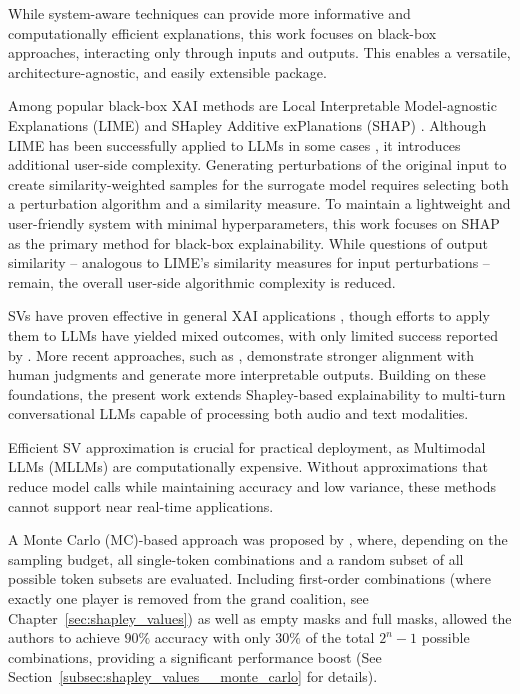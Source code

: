 \newpage
While system-aware techniques can provide more informative and computationally efficient explanations, this work focuses on black-box approaches, interacting only through inputs and outputs. This enables a versatile, architecture-agnostic, and easily extensible package.

Among popular black-box XAI methods are Local Interpretable Model-agnostic Explanations (LIME) and SHapley Additive exPlanations (SHAP) \parencite{explainableaihistory}. Although LIME has been successfully applied to LLMs in some cases \parencite{dehghani2025explaininglargelanguagemodels}, it introduces additional user-side complexity. Generating perturbations of the original input to create similarity-weighted samples for the surrogate model requires selecting both a perturbation algorithm and a similarity measure. To maintain a lightweight and user-friendly system with minimal hyperparameters, this work focuses on SHAP as the primary method for black-box explainability. While questions of output similarity -- analogous to LIME’s similarity measures for input perturbations -- remain, the overall user-side algorithmic complexity is reduced.

SVs have proven effective in general XAI applications \parencite{lundberg2017unifiedapproachinterpretingmodel}, though efforts to apply them to LLMs have yielded mixed outcomes, with only limited success reported by \textcite{explainableaihistory}. More recent approaches, such as \textcite{goldshmidt2024tokenshapinterpretinglargelanguage}, demonstrate stronger alignment with human judgments and generate more interpretable outputs. Building on these foundations, the present work extends Shapley-based explainability to multi-turn conversational LLMs capable of processing both audio and text modalities.

Efficient SV approximation is crucial for practical deployment, as Multimodal LLMs (MLLMs) are computationally expensive. Without approximations that reduce model calls while maintaining accuracy and low variance, these methods cannot support near real-time applications.

A Monte Carlo (MC)-based approach was proposed by \textcite{goldshmidt2024tokenshapinterpretinglargelanguage}, where, depending on the sampling budget, all single-token combinations and a random subset of all possible token subsets are evaluated. Including first-order combinations (where exactly one player is removed from the grand coalition, see Chapter~\ref{sec:shapley_values}) as well as empty masks and full masks, allowed the authors to achieve $90\%$ accuracy with only $30\%$ of the total $2^n - 1$ possible combinations, providing a significant performance boost (See Section~\ref{subsec:shapley_values__monte_carlo} for details).

